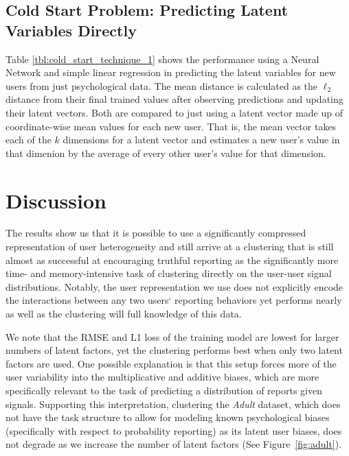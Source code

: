 \documentclass{article}
\begin{document}
\subsection{Cold Start Problem: Predicting Latent Variables Directly} Table \ref{tbl:cold_start_technique_1} shows the performance using a Neural Network and simple linear regression in predicting the latent variables for new users from just psychological data. The mean distance is calculated as the $\ell_{2}$ distance from their final trained values after observing predictions and updating their latent vectors. Both are compared to just using a latent vector made up of coordinate-wise mean values for each new user. That is, the mean vector takes each of the $k$ dimensions for a latent vector and estimates a new user's value in that dimenion by the average of every other user's value for that dimension. 



\section{Discussion}



The results show us that it is possible to use a significantly compressed representation of user heterogeneity and still arrive at a clustering that is still almost as successful at encouraging truthful reporting as the significantly more time- and memory-intensive task of clustering directly on the user-user signal distributions. Notably, the user representation we use does not explicitly encode the interactions between any two users` reporting behaviors yet performs nearly as well as the clustering will full knowledge of this data.

We note that the RMSE and L1 loss of the training model are lowest for larger numbers of latent factors, yet the clustering performs best when only two latent factors are used. One possible explanation is that this setup forces more of the user variability into the multiplicative and additive biases, which are more specifically relevant to the task of predicting a distribution of reports given signals. Supporting this interpretation, clustering the \emph{Adult} dataset, which does not have the task structure to allow for modeling known psychological biases (specifically with respect to probability reporting) as its latent user biases, does not degrade as we increase the number of latent factors (See Figure~\ref{fig:adult}).
\end{document}
